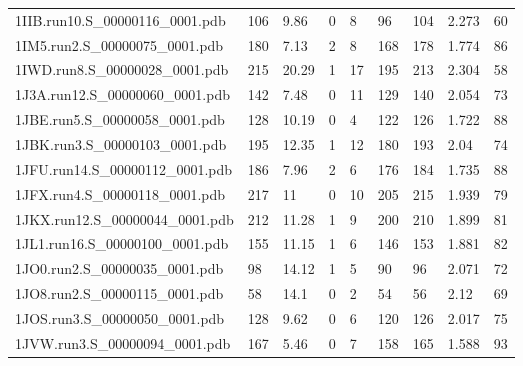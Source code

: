 \documentclass{bioinfo}
\begin{document}
\begin{table}[!t]
{\begin{tabular}{lllllllll}
    1IIB.run10.S\_00000116\_0001.pdb & 106      & 9.86       & 0           & 8           & 96          & 104     & 2.273           & 60           \\
    1IM5.run2.S\_00000075\_0001.pdb & 180      & 7.13       & 2           & 8           & 168         & 178     & 1.774           & 86           \\
    1IWD.run8.S\_00000028\_0001.pdb & 215      & 20.29      & 1           & 17          & 195         & 213     & 2.304           & 58           \\
    1J3A.run12.S\_00000060\_0001.pdb & 142      & 7.48       & 0           & 11          & 129         & 140     & 2.054           & 73           \\
    1JBE.run5.S\_00000058\_0001.pdb & 128      & 10.19      & 0           & 4           & 122         & 126     & 1.722           & 88           \\
    1JBK.run3.S\_00000103\_0001.pdb & 195      & 12.35      & 1           & 12          & 180         & 193     & 2.04            & 74           \\
    1JFU.run14.S\_00000112\_0001.pdb & 186      & 7.96       & 2           & 6           & 176         & 184     & 1.735           & 88           \\
    1JFX.run4.S\_00000118\_0001.pdb & 217      & 11         & 0           & 10          & 205         & 215     & 1.939           & 79           \\
    1JKX.run12.S\_00000044\_0001.pdb & 212      & 11.28      & 1           & 9           & 200         & 210     & 1.899           & 81           \\
    1JL1.run16.S\_00000100\_0001.pdb & 155      & 11.15      & 1           & 6           & 146         & 153     & 1.881           & 82           \\
    1JO0.run2.S\_00000035\_0001.pdb & 98       & 14.12      & 1           & 5           & 90          & 96      & 2.071           & 72           \\
    1JO8.run2.S\_00000115\_0001.pdb & 58       & 14.1       & 0           & 2           & 54          & 56      & 2.12            & 69           \\
    1JOS.run3.S\_00000050\_0001.pdb & 128      & 9.62       & 0           & 6           & 120         & 126     & 2.017           & 75           \\
    1JVW.run3.S\_00000094\_0001.pdb & 167      & 5.46       & 0           & 7           & 158         & 165     & 1.588           & 93           \\

\end{tabular}}
\end{table}
\end{document}
